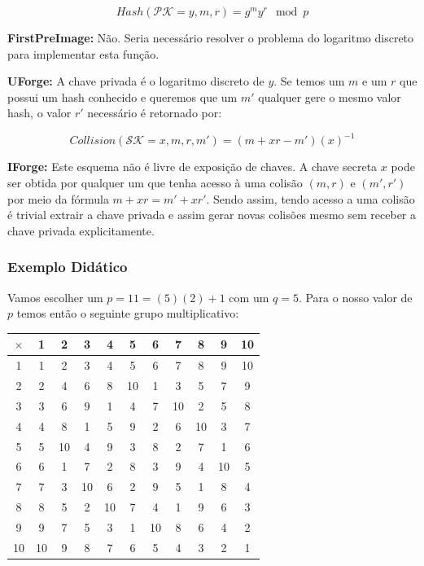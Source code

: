 \documentclass[a4paper]{article}
\begin{document}
$$
Hash(\mathcal{PK}=y, m, r) = g^my^r \mod p
$$

\textbf{FirstPreImage:} Não. Seria necessário resolver o problema do
logaritmo discreto para implementar esta função.

\textbf{UForge:} A chave privada é o logaritmo discreto de $y$. Se
temos um $m$ e um $r$ que possui um hash conhecido e queremos que um
$m'$ qualquer gere o mesmo valor hash, o valor $r'$ necessário é
retornado por:

$$
Collision(\mathcal{SK}=x, m, r, m') = (m+xr-m')(x)^{-1}
$$

\textbf{IForge:} Este esquema não é livre de exposição de chaves. A
chave secreta $x$ pode ser obtida por qualquer um que tenha acesso à
uma colisão $(m, r)$ e $(m', r')$ por meio da fórmula $m+xr =
m'+xr'$. Sendo assim, tendo acesso a uma colisão é trivial extrair a
chave privada e assim gerar novas colisões mesmo sem receber a chave
privada explicitamente.




  

\subsubsection{Exemplo Didático}

Vamos escolher um $p=11=(5)(2)+1$ com um $q=5$. Para o nosso valor de
$p$ temos então o seguinte grupo multiplicativo:

\begin{tabular}{|c||c|c|c|c|c|c|c|c|c|c|}
  \hline
$\times$&1&2&3&4&5&6&7&8&9&10\\
  \hline
  \hline
1&1&2&3&4&5&6&7&8&9&10\\
\hline
2&2&4&6&8&10&1&3&5&7&9\\
\hline
3&3&6&9&1&4&7&10&2&5&8\\
\hline
4&4&8&1&5&9&2&6&10&3&7\\
\hline
5&5&10&4&9&3&8&2&7&1&6\\
\hline
6&6&1&7&2&8&3&9&4&10&5\\
\hline
7&7&3&10&6&2&9&5&1&8&4\\
\hline
8&8&5&2&10&7&4&1&9&6&3\\
\hline
9&9&7&5&3&1&10&8&6&4&2\\
\hline
10&10&9&8&7&6&5&4&3&2&1\\
\hline
\end{tabular}
\end{document}
